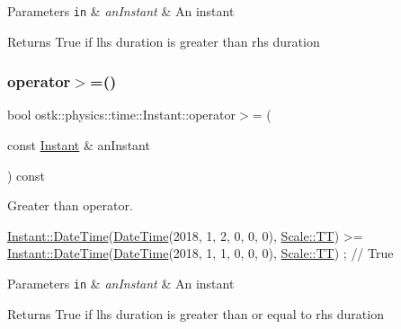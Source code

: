 \begin{DoxyParams}[1]{Parameters}
\mbox{\tt in}  & {\em an\+Instant} & An instant \\
\hline
\end{DoxyParams}
\begin{DoxyReturn}{Returns}
True if lhs duration is greater than rhs duration 
\end{DoxyReturn}
\mbox{\label{classostk_1_1physics_1_1time_1_1_instant_af5370a5e8c4b39f46f2baf79105b35cc}} 
\subsubsection{\texorpdfstring{operator$>$=()}{operator>=()}}
{\footnotesize\ttfamily bool ostk\+::physics\+::time\+::\+Instant\+::operator$>$= (\begin{DoxyParamCaption}\item[{const \hyperlink{classostk_1_1physics_1_1time_1_1_instant}{Instant} \&}]{an\+Instant }\end{DoxyParamCaption}) const}



Greater than operator. 


\begin{DoxyCode}
\hyperlink{classostk_1_1physics_1_1time_1_1_instant_afd5725574a02389b80fad4baff313c8a}{Instant::DateTime}(\hyperlink{classostk_1_1physics_1_1time_1_1_instant_afd5725574a02389b80fad4baff313c8a}{DateTime}(2018, 1, 2, 0, 0, 0), 
      \hyperlink{namespaceostk_1_1physics_1_1time_adf23d37bd8641fb76a0e98ab46a70df7adf1f3edb9115acb0a1e04209b7a9937b}{Scale::TT}) >= \hyperlink{classostk_1_1physics_1_1time_1_1_instant_afd5725574a02389b80fad4baff313c8a}{Instant::DateTime}(\hyperlink{classostk_1_1physics_1_1time_1_1_instant_afd5725574a02389b80fad4baff313c8a}{DateTime}(2018, 1, 1, 0, 0, 0), 
      \hyperlink{namespaceostk_1_1physics_1_1time_adf23d37bd8641fb76a0e98ab46a70df7adf1f3edb9115acb0a1e04209b7a9937b}{Scale::TT}) ; \textcolor{comment}{// True}
\end{DoxyCode}



\begin{DoxyParams}[1]{Parameters}
\mbox{\tt in}  & {\em an\+Instant} & An instant \\
\hline
\end{DoxyParams}
\begin{DoxyReturn}{Returns}
True if lhs duration is greater than or equal to rhs duration 
\end{DoxyReturn}
\mbox{\label{classostk_1_1physics_1_1time_1_1_instant_ad2848890ee69709ed5540d1c8fa017e1}} 
